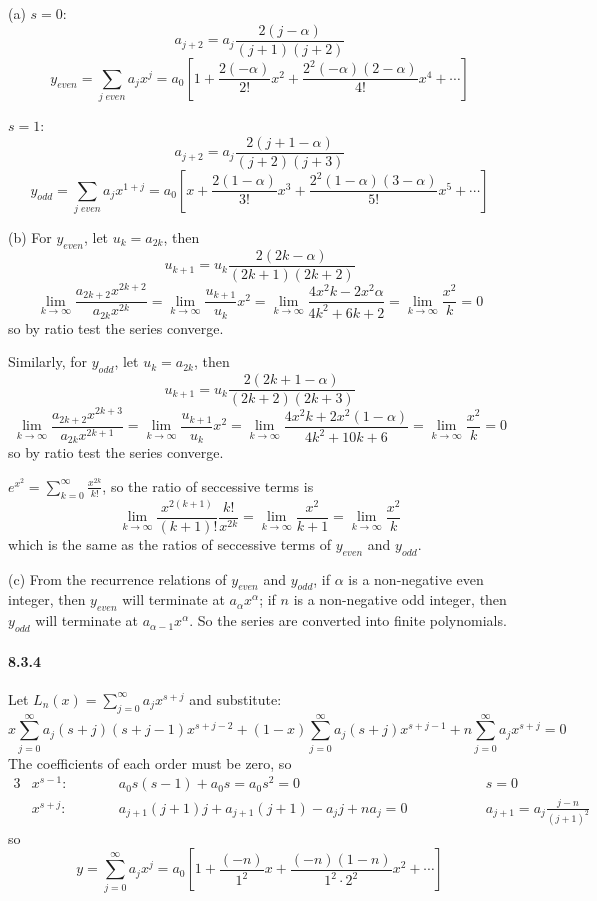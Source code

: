 \documentclass[a4paper]{article}
\begin{document}
(a)
$s=0$:
\[
a_{j+2}=a_j\frac{2(j-\alpha)}{(j+1)(j+2)}
\]
\[
y_{even}=\sum_{j\;even}a_jx^j=a_0\left[1+\frac{2(-\alpha)}{2!}x^2+\frac{2^2(-\alpha)(2-\alpha)}{4!}x^4+\cdots \right]
\]

$s=1$:
\[
a_{j+2}=a_j\frac{2(j+1-\alpha)}{(j+2)(j+3)}
\]
\[
y_{odd}=\sum_{j\;even}a_jx^{1+j}=a_0\left[x+\frac{2(1-\alpha)}{3!}x^3+\frac{2^2(1-\alpha)(3-\alpha)}{5!}x^5+\cdots \right]
\]

(b)
For $y_{even}$, let $u_k=a_{2k}$, then 
\[
u_{k+1}=u_k\frac{2(2k-\alpha)}{(2k+1)(2k+2)}
\]
\[
\lim_{k\to\infty}\frac{a_{2k+2}x^{2k+2}}{a_{2k}x^{2k}}=\lim_{k\to\infty}\frac{u_{k+1}}{u_k}x^2=\lim_{k\to\infty}\frac{4x^2k-2x^2\alpha}{4k^2+6k+2}=\lim_{k\to\infty}\frac{x^2}{k}=0
\]
so by ratio test the series converge.
\medskip

Similarly, for $y_{odd}$, let $u_k=a_{2k}$, then 
\[
u_{k+1}=u_k\frac{2(2k+1-\alpha)}{(2k+2)(2k+3)}
\]
\[
\lim_{k\to\infty}\frac{a_{2k+2}x^{2k+3}}{a_{2k}x^{2k+1}}=\lim_{k\to\infty}\frac{u_{k+1}}{u_k}x^2=\lim_{k\to\infty}\frac{4x^2k+2x^2(1-\alpha)}{4k^2+10k+6}=\lim_{k\to\infty}\frac{x^2}{k}=0
\]
so by ratio test the series converge.
\medskip

$e^{x^2}=\sum_{k=0}^\infty\frac{x^{2k}}{k!}$, so the ratio of seccessive terms is
\[
\lim_{k\to\infty}\frac{x^{2(k+1)}}{(k+1)!}\frac{k!}{x^{2k}}=\lim_{k\to\infty}\frac{x^2}{k+1}=\lim_{k\to\infty}\frac{x^2}{k}
\]
which is the same as the ratios of seccessive terms of $y_{even}$ and $y_{odd}$.
\medskip

(c)
From the recurrence relations of $y_{even}$ and $y_{odd}$, if $\alpha$ is a non-negative even integer, then $y_{even}$ will terminate at $a_{\alpha}x^{\alpha}$; if $n$ is a non-negative odd integer, then $y_{odd}$ will terminate at $a_{\alpha-1}x^{\alpha}$. So the series are converted into finite polynomials.

\paragraph{8.3.4}
Let $L_n(x)=\sum_{j=0}^\infty a_jx^{s+j}$ and substitute:
\[
x\sum_{j=0}^\infty a_j(s+j)(s+j-1)x^{s+j-2}+(1-x)\sum_{j=0}^\infty a_j(s+j)x^{s+j-1}+n\sum_{j=0}^\infty a_jx^{s+j}=0
\]
The coefficients of each order must be zero, so
\begin{alignat*}{3}
    & x^{s-1}:\qquad && a_0s(s-1)+a_0s=a_0s^2=0\qquad && s=0\\
    & x^{s+j}:\qquad && a_{j+1}(j+1)j+a_{j+1}(j+1)-a_jj+na_j=0\qquad\qquad && a_{j+1}=a_j\frac{j-n}{(j+1)^2}
\end{alignat*}
so
\[
y=\sum_{j=0}^\infty a_jx^j=a_0\left[1+\frac{(-n)}{1^2}x+\frac{(-n)(1-n)}{1^2\cdot2^2}x^2+\cdots \right]
\]
\end{document}
